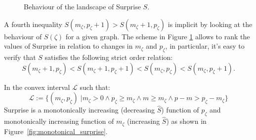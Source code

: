 \begin{figure}[htb]
\centering
{}
\caption{Behaviour of the landscape of Surprise $S$.}
\label{fig:surprisebehaviour}
\end{figure}

A fourth inequality $S(m_\zeta,p_\zeta+1)>S(m_\zeta+1,p_\zeta)$ is implicit by looking at the behaviour of $S(\zeta)$ for a given graph. The scheme in Figure \ref{fig:surprisebehaviour} allows to rank the values of Surprise in relation to changes in $m_\zeta$ and $p_\zeta$, in particular, it's easy to verify that $S$ satisfies the following strict order relation:
\begin{equation}\label{eq:surpriseorderrelation}
S(m_\zeta+1,p_\zeta)<S(m_\zeta+1,p_\zeta+1)<S(m_\zeta,p_\zeta)<S(m_\zeta,p_\zeta+1).
\end{equation}

In the convex interval $\mathcal{L}$ such that:
\begin{equation}
\mathcal{L} := \{ ( m_\zeta,p_\zeta) \; | m_\zeta > 0 \land p_\zeta \geq m_\zeta \land m \geq m_\zeta \land p-m > p_\zeta - m_\zeta \}
\end{equation}
Surprise is a monotonically increasing (decreasing $\hat{S}$) function of $p_\zeta$ and monotonically increasing function of $m_\zeta$ (increasing $\hat{S}$) as shown in Figure~\ref{fig:monotonical_surprise}.


